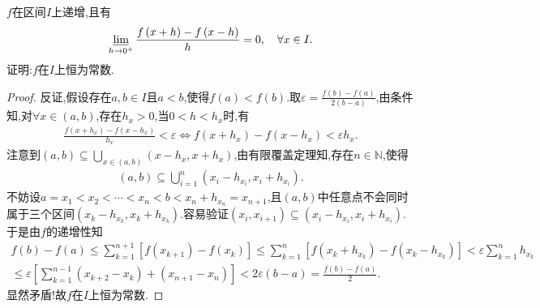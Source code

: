 \documentclass[../../main.tex]{subfiles}%
\begin{document}
\begin{proposition}\label{proposition:递增函数Schwarz导下极限为0必为常函数}
$f$在区间$I$上递增,且有
\begin{align*}
\varliminf\limits_{h\rightarrow 0^+}\frac{f\left( x+h \right) -f\left( x-h \right)}{h}=0,\quad \forall x\in I.
\end{align*}
证明:$f$在$I$上恒为常数.
\end{proposition}
\begin{proof}
反证,假设存在$a,b\in I$且$a<b$,使得$f\left( a \right) <f\left( b \right)$.取$\varepsilon =\frac{f\left( b \right) -f\left( a \right)}{2\left( b-a \right)}$,由条件知,对$\forall x\in \left( a,b \right)$,存在$h_x>0$,当$0<h<h_x$时,有
\begin{align*}
\frac{f\left( x+h_x \right) -f\left( x-h_x \right)}{h_x}<\varepsilon \Longleftrightarrow f\left( x+h_x \right) -f\left( x-h_x  \right) <\varepsilon h_x.
\end{align*}
注意到$\left( a,b \right) \subseteq \bigcup\limits_{x\in \left( a,b \right)}{\left( x-h_x ,x+h_x \right)}$,由有限覆盖定理知,存在$n\in \mathbb{N}$,使得
\begin{align*}
\left( a,b \right) \subseteq \bigcup\limits_{i=1}^n{\left( x_i-h_{x_i} ,x_i+h_{x_i} \right)}.
\end{align*}
不妨设$a=x_1<x_2<\cdots <x_n<b<x_n+h_{x_n}=x_{n+1}$,且$\left( a,b \right)$中任意点不会同时属于三个区间$\left( x_k-h_{x_k},x_k+h_{x_k} \right)$.容易验证$\left( x_i,x_{i+1} \right) \subseteq \left( x_i-h_{x_i},x_i+h_{x_i} \right)$.于是由$f$的递增性知
\begin{align*}
f\left( b \right) -f\left( a \right) \leqslant \sum\limits_{k=1}^{n+1}{\left[ f\left( x_{k+1} \right) -f\left( x_k \right) \right]}\leqslant \sum\limits_{k=1}^n{\left[ f\left( x_k+h_{x_k} \right) -f\left( x_k-h_{x_k} \right) \right]}<\varepsilon \sum\limits_{k=1}^n{h_{x_k}}\\
\leqslant \varepsilon \left[ \sum\limits_{k=1}^{n-1}{\left( x_{k+2}-x_k \right)}+\left( x_{n+1}-x_n \right) \right] <2\varepsilon \left( b-a \right) =\frac{f\left( b \right) -f\left( a \right)}{2}.
\end{align*}
显然矛盾!故$f$在$I$上恒为常数.
\end{proof}
\end{document}
